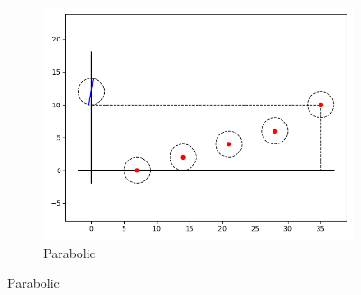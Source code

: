 \documentclass[12pt]{article}
\begin{document}
\begin{figure}
\begin{subfigure}{.33\textwidth}
    \includegraphics[width=\textwidth]{parabolic-layout.png}
    \caption{Parabolic}    
\end{subfigure}



\end{figure}
\end{document}
